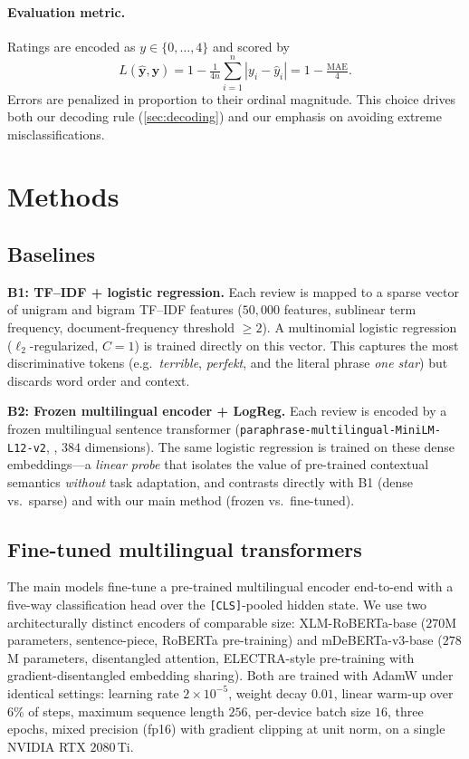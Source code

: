 \documentclass{article}
\theoremstyle{plain}
\theoremstyle{definition}
\theoremstyle{remark}
\begin{document}
\paragraph{Evaluation metric.}
Ratings are encoded as $y\in\{0,\dots,4\}$ and scored by
\begin{equation}
\label{eq:score}
L(\hat{\mathbf{y}},\mathbf{y})
  = 1-\tfrac{1}{4n}\sum_{i=1}^{n}|y_i-\hat y_i|
  = 1-\tfrac{\mathrm{MAE}}{4}.
\end{equation}
Errors are penalized in proportion to their ordinal magnitude. This
choice drives both our decoding rule (\cref{sec:decoding}) and our
emphasis on avoiding extreme misclassifications.

\section{Methods}
\label{sec:methods}

\subsection{Baselines}
\label{sec:baselines}
\textbf{B1: TF--IDF + logistic regression.} Each review is mapped to a
sparse vector of unigram and bigram TF--IDF features
($50{,}000$ features, sublinear term frequency, document-frequency
threshold $\geq\!2$). A multinomial logistic regression
($\ell_2$-regularized, $C{=}1$) is trained directly on this vector.
This captures the most discriminative tokens (e.g.\ \textit{terrible},
\textit{perfekt}, and the literal phrase \textit{one star}) but
discards word order and context.

\textbf{B2: Frozen multilingual encoder + LogReg.} Each review is
encoded by a frozen multilingual sentence transformer
(\texttt{paraphrase-multilingual-MiniLM-L12-v2},
\citealt{reimers2019sbert}, $384$ dimensions). The same logistic
regression is trained on these dense embeddings---a \emph{linear
probe} that isolates the value of pre-trained contextual semantics
\emph{without} task adaptation, and contrasts directly with B1
(dense vs.\ sparse) and with our main method (frozen vs.\ fine-tuned).

\subsection{Fine-tuned multilingual transformers}
\label{sec:main}
The main models fine-tune a pre-trained multilingual encoder
end-to-end with a five-way classification head over the
\texttt{[CLS]}-pooled hidden state.
We use two architecturally distinct encoders of comparable size:
XLM-RoBERTa-base \citep{conneau2020xlmr} ($270$M parameters,
sentence-piece, RoBERTa pre-training) and mDeBERTa-v3-base
\citep{he2023debertav3} ($278$M parameters, disentangled attention,
ELECTRA-style pre-training with gradient-disentangled embedding
sharing). Both are trained with AdamW \citep{loshchilov2019adamw}
under identical settings: learning rate $2{\times}10^{-5}$, weight
decay $0.01$, linear warm-up over $6\%$ of steps, maximum sequence
length $256$, per-device batch size $16$, three epochs, mixed
precision (fp16) with gradient clipping at unit norm, on a single
NVIDIA RTX $2080$\,Ti.
\end{document}
